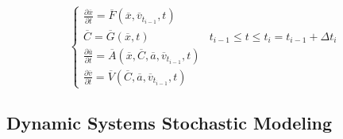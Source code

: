 \begin{equation}
\label{eq:auxiliaryVariables}
\left\{\begin{matrix}
\frac{\partial \overline{x} }{\partial t} = \overline{F}\left (  \overline{x},\overline{v}_{t_{i-1}}, t \right )  & \\
\overline{C} =  \overline{G}(\overline{x},t)  & t_{i-1} \leq t \leq  t_{i} =  t_{i-1} + \Delta  t_{i}\: \\
\frac{\partial \overline{a} }{\partial t} = \overline{A}\left (  \overline{x},\overline{C},\overline{a},\overline{v}_{t_{i-1}}, t \right ) \\
\frac{\partial \overline{v} }{\partial t} = \overline{V}\left (  \overline{C},\overline{a}, \overline{v}_{t_{i-1}}, t \right )  &
\end{matrix}\right.
\end{equation}

\subsection{Dynamic Systems Stochastic Modeling}
%
